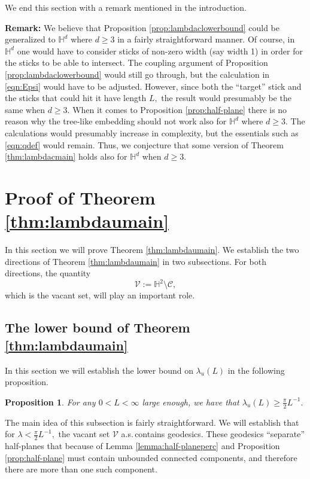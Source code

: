 \documentclass[a4paper,12pt]{article}
\newcommand{\BH}{{\mathbb{H}}}
\newcommand{\CC}{{\mathcal{C}}}
\newcommand{\CV}{{\mathcal{V}}}
\newtheorem{proposition}[theorem]{Proposition}
\begin{document}
We end this section with a remark mentioned in the introduction.

\noindent
{\bf Remark:}
We believe that Proposition \ref{prop:lambdaclowerbound} could be generalized to $\BH^d$
where $d\geq 3$ in a fairly straightforward manner. Of course, in $\BH^d$ one would have to consider sticks
of non-zero width (say width 1) in order for the sticks to be able to intersect. The coupling 
argument of Proposition \ref{prop:lambdaclowerbound} would still go through, but the calculation in 
\eqref{eqn:Epsi} would have to be adjusted. However, since both the ``target'' stick and the sticks 
that could hit it have length $L,$ the result would presumably be the same when $d\geq 3.$
When it comes to Proposition \ref{prop:half-plane} there is no reason why the tree-like embedding
should not work also for $\BH^d$ where $d\geq 3.$ The calculations would presumably increase 
in complexity, but the essentials such as \eqref{eqn:qdef} would remain. Thus, we conjecture 
that some version of Theorem \ref{thm:lambdacmain} holds also for $\BH^d$ when $d\geq 3.$






\section{Proof of Theorem \ref{thm:lambdaumain}} \label{sec:lambdau}
In this section we will prove Theorem \ref{thm:lambdaumain}. We establish the two 
directions of Theorem \ref{thm:lambdaumain} in two subsections. For both directions, 
the quantity
\begin{equation} \label{eqn:Vdef}
\CV:=\BH^2 \setminus \CC,    
\end{equation}
which is the vacant set, will play an important role. 



\subsection{The lower bound of Theorem \ref{thm:lambdaumain}}
In this section we will establish the lower bound on $\lambda_u(L)$  
in the following proposition.
\begin{proposition} \label{prop:lambdaulower}
For any $0<L<\infty$ large enough, we have that $\lambda_u(L)
\geq \frac{\pi}{2}L^{-1}.$
\end{proposition}
The main idea of this subsection is fairly straightforward. We will establish 
that for $\lambda<\frac{\pi}{2}L^{-1},$ the vacant set $\CV$ a.s.\,contains geodesics.  
These geodesics ``separate'' half-planes that because of Lemma \ref{lemma:half-planeperc}
and Proposition \ref{prop:half-plane} must contain unbounded connected components, 
and therefore there are more than one such component. 
\end{document}
